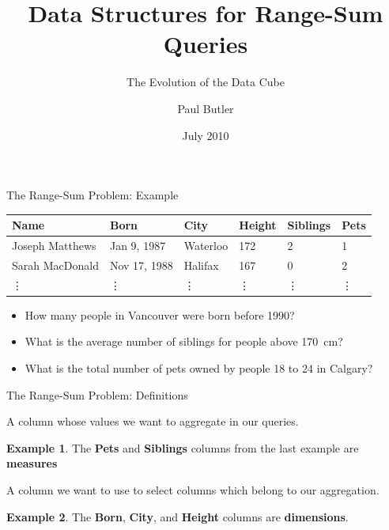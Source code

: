 \documentclass{beamer}
\title{Data Structures for Range-Sum Queries}
\subtitle{The Evolution of the Data Cube}
\author{Paul Butler}
\institute{
    CUMC 2010\\
    Waterloo, Ontario
}
\date{July 2010}
\theoremstyle{definition}
\newtheorem{myexample}{Example}
\theoremstyle{definition}
\begin{document}
\begin{frame}[plain]
    \titlepage
\end{frame}

\begin{frame}{The Range-Sum Problem: Example}
    \begin{table}[h]\footnotesize
        \begin{tabular}{ | l | l | l | l | l | l |}
        \hline
        \rowcolor{red!20!green!20!blue!20}
        \textbf{Name} & \textbf{Born} & \textbf{City} & \textbf{Height} & \textbf{Siblings} & \textbf{Pets} \\ \hline
        Joseph Matthews & Jan 9, 1987 & Waterloo & 172 & 2 &  1 \\ \hline
        Sarah MacDonald & Nov 17, 1988 & Halifax & 167 & 0 & 2 \\ \hline
        \vdots & \vdots & \vdots & \vdots & \vdots & \vdots \\ \hline
        \end{tabular}
    \end{table}

    \begin{itemize}
        \item<+-> How many people in Vancouver were born before 1990?
        \item<+-> What is the average number of siblings for people above 170~cm?
        \item<+-> What is the total number of pets owned by people 18 to 24 in Calgary?
    \end{itemize}
\end{frame}

\begin{frame}{The Range-Sum Problem: Definitions}
    \begin{definition}[Measure]
        A column whose values we want to aggregate in our queries.
    \end{definition}
    \pause
    \begin{myexample}
        The \textbf{Pets} and \textbf{Siblings} columns from the last example are \textbf{measures}
    \end{myexample}
    \pause
    \begin{definition}[Dimension]
        A column we want to use to select columns which belong to our aggregation.
    \end{definition}
    \pause
    \begin{myexample}
        The \textbf{Born}, \textbf{City}, and \textbf{Height} columns are \textbf{dimensions}.
    \end{myexample}
\end{frame}
\end{document}

